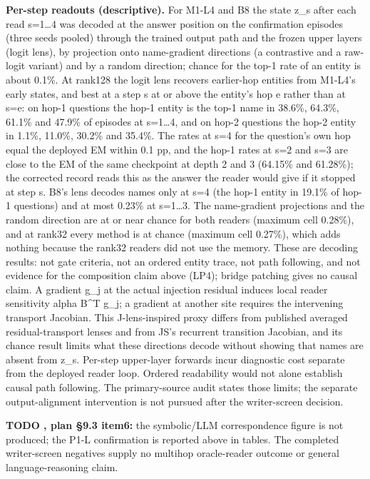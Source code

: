 \textbf{Per-step readouts (descriptive).} For M1-L4 and B8 the state z\_s after each read s=1\ldots{}4 was decoded at the answer
position on the confirmation episodes (three seeds pooled) through the trained output path and the frozen upper layers (logit
lens), by projection onto name-gradient directions (a contrastive and a raw-logit variant) and by a random direction; chance for
the top-1 rate of an entity is about 0.1\%. At rank128 the logit lens recovers earlier-hop entities from M1-L4’s  %
early states, and best at a step s at or above the entity’s hop e rather than at s=e: on hop-1 questions the hop-1 entity is the
top-1 name in 38.6\%, 64.3\%, 61.1\% and 47.9\% of episodes at s=1\ldots{}4, and on hop-2 questions the hop-2 entity in 1.1\%, 11.0\%, 30.2\% and
35.4\%. The rates at s=4 for the question’s own hop equal the deployed EM within 0.1 pp, and the hop-1 rates at s=2 and s=3 are close
to the EM of the same checkpoint at depth 2 and 3 (64.15\% and 61.28\%); the corrected record reads this as the answer the reader
would give if it stopped at step s. B8’s lens decodes names only at s=4 (the hop-1 entity in 19.1\% of hop-1  %
questions) and at most 0.23\% at s=1\ldots{}3. The name-gradient projections and the random direction are at or near chance for both
readers (maximum cell 0.28\%), and at rank32 every method is at chance (maximum cell 0.27\%), which adds nothing because the rank32
readers did not use the memory. These are decoding results: not gate criteria, not an ordered entity trace, not path  %
following, and not evidence for the composition claim above (LP4); bridge patching gives no causal claim.  %
A gradient g\_j at the actual injection
residual induces local reader sensitivity alpha B\textasciicircum{}T g\_j; a gradient at another
site requires the intervening transport Jacobian. This J-lens-inspired proxy differs from published
averaged residual-transport lenses and from JS’s recurrent transition Jacobian, and its chance result limits what these directions
decode without showing that names are absent from z\_s.
Per-step upper-layer forwards incur diagnostic cost separate from
the deployed reader loop. Ordered readability would not alone  %
establish causal path following. The primary-source audit
states those limits; the separate output-alignment intervention is not pursued
after the writer-screen decision.  %

\textbf{TODO ,  plan \S{}9.3 item6:} the symbolic/\allowbreak{}LLM correspondence figure is not produced; the
P1-L confirmation is reported above in tables. The completed writer-screen negatives supply no multihop
oracle-reader outcome or general language-reasoning claim.  %

